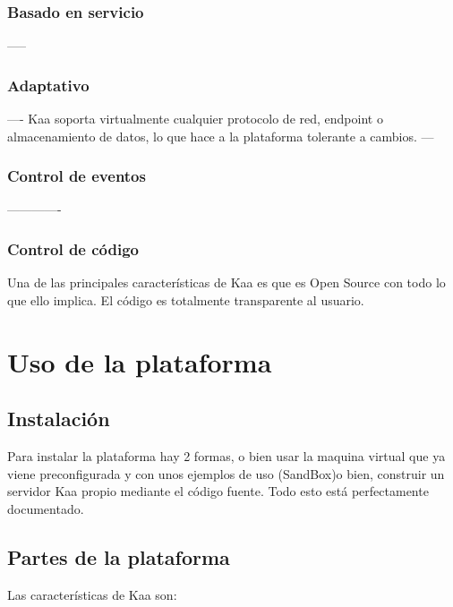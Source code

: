 \documentclass[12pt, twoside]{book}
\begin{document}
\subsubsection*{Basado en servicio}
-----

\subsubsection*{Adaptativo}
----
Kaa soporta virtualmente cualquier protocolo de red, endpoint o almacenamiento de datos, lo que hace a la plataforma tolerante a cambios.
---


\subsubsection*{Control de eventos}
-------------



\subsubsection*{Control de código}
Una de las principales características de Kaa es que es Open Source con todo lo que ello implica. El código es totalmente transparente al usuario.


\section{Uso de la plataforma}
\subsection{Instalación}
Para instalar la plataforma hay 2 formas, o bien usar la maquina virtual que ya viene preconfigurada y con unos ejemplos de uso (SandBox)o bien, construir un servidor Kaa propio mediante el código fuente. Todo esto está perfectamente documentado.
\subsection{Partes de la plataforma}
Las características de Kaa son:
\end{document}

